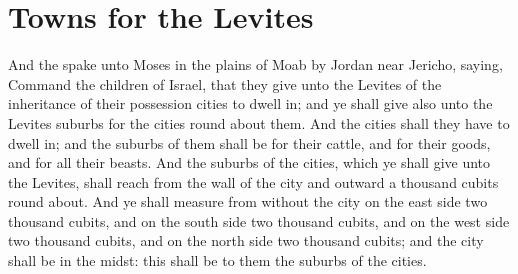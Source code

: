\section*{Towns for the Levites}
\begin{biblechapter} %
\verse And the \LORD spake unto Moses in the plains of Moab by Jordan near Jericho, saying,
\verse Command the children of Israel, that they give unto the Levites of the inheritance of their possession cities to dwell in; and ye shall give also unto the Levites suburbs for the cities round about them.
\verse And the cities shall they have to dwell in; and the suburbs of them shall be for their cattle, and for their goods, and for all their beasts.
\verse And the suburbs of the cities, which ye shall give unto the Levites, shall reach from the wall of the city and outward a thousand cubits round about.
\verse And ye shall measure from without the city on the east side two thousand cubits, and on the south side two thousand cubits, and on the west side two thousand cubits, and on the north side two thousand cubits; and the city shall be in the midst: this shall be to them the suburbs of the cities.

\end{biblechapter}
